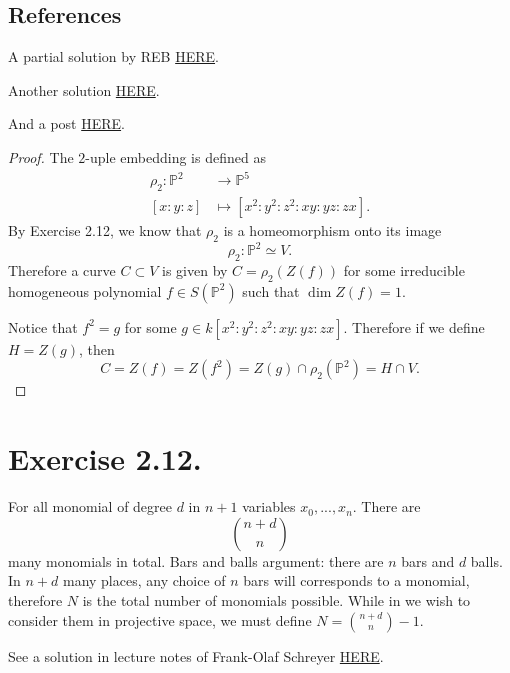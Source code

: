 \subsection{References}

A partial solution by REB \href{https://math.berkeley.edu/~reb/courses/256A/1.2.pdf}{HERE}.

Another solution \href{http://mcs.unife.it/alex.massarenti/files/exag1.pdf}{HERE}.

And a post \href{https://math.stackexchange.com/questions/550816/why-this-property-holds-in-a-veronese-surface}{HERE}.

\begin{proof}
    The $2$-uple embedding is defined as 
    \begin{align*}
        \rho_2:\mathbb P^2 &\to\mathbb P^5\\
         [x:y:z] &\mapsto[x^2:y^2:z^2:xy:yz:zx].
    \end{align*}
    By Exercise 2.12, we know that $\rho_2$ is a homeomorphism onto its image \[\rho_2:\mathbb P^2\simeq V.\] Therefore a curve $C\subset V$ is given by 
    $C=\rho_2(Z(f))$ for some irreducible homogeneous polynomial $f\in S(\mathbb P^2)$ such that $\operatorname{dim}Z(f)=1$.


    Notice that $f^2=g$ for some $g\in k[x^2:y^2:z^2:xy:yz:zx]$. Therefore if we define $H=Z(g)$, then
    \[C=Z(f)=Z(f^2)=Z(g)\cap \rho_2(\mathbb P^2)=H\cap V.\]

\end{proof}


\section{Exercise 2.12.}

For all monomial of degree $d$ in $n+1$ variables $x_0,...,x_n$. 
There are \[\binom{n+d}{n}\] many monomials in total. Bars and balls argument: there are $n$ bars and $d$ balls. In $n+d$ many places, any choice of $n$ bars will corresponds to a monomial, therefore $N$ is the total number of monomials possible. While in we wish to consider them in projective space, we must define $N=\binom{n+d}{n}-1$.

See a solution in lecture notes of Frank-Olaf Schreyer \href{https://www.math.uni-sb.de/ag/schreyer/images/PDFs/teaching/ss21_perugia/AlgGeomSlides19.pdf}{HERE}.

